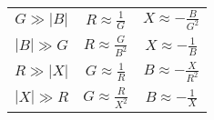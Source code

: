 \begin{description}
\begin{tabular}{ccc}
$G \gg |B|$ & $R \approx \frac{1}{G}$ & $X \approx - \frac{B}{G^2}$ \\
$|B| \gg G$ & $R \approx \frac{G}{B^2}$ & $X \approx - \frac{1}{B}$ \\
$R \gg |X|$ & $G \approx \frac{1}{R}$ & $B \approx - \frac{X}{R^2}$ \\
$|X| \gg R$ & $G \approx \frac{R}{X^2}$ & $B \approx - \frac{1}{X}$ \\
\end{tabular}
\end{description}